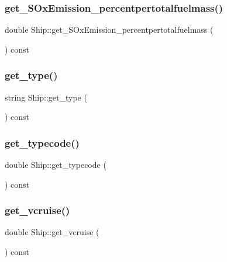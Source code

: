 \mbox{\label{class_ship_a998e0000dd910bc994fd12f4aaf563b0}} 
\subsubsection{\texorpdfstring{get\_SOxEmission\_percentpertotalfuelmass()}{get\_SOxEmission\_percentpertotalfuelmass()}}
{\footnotesize\ttfamily double Ship\+::get\+\_\+\+S\+Ox\+Emission\+\_\+percentpertotalfuelmass (\begin{DoxyParamCaption}{ }\end{DoxyParamCaption}) const}

\mbox{\label{class_ship_aebaeb01a662f1f7e931b98cdea0c53e9}} 
\subsubsection{\texorpdfstring{get\_type()}{get\_type()}}
{\footnotesize\ttfamily string Ship\+::get\+\_\+type (\begin{DoxyParamCaption}{ }\end{DoxyParamCaption}) const}

\mbox{\label{class_ship_aef1503d801ea6d480de882893ca1f492}} 
\subsubsection{\texorpdfstring{get\_typecode()}{get\_typecode()}}
{\footnotesize\ttfamily double Ship\+::get\+\_\+typecode (\begin{DoxyParamCaption}{ }\end{DoxyParamCaption}) const}

\mbox{\label{class_ship_a4eb1d4b2502b0aa5a5d4d18fbcdb4af0}} 
\subsubsection{\texorpdfstring{get\_vcruise()}{get\_vcruise()}}
{\footnotesize\ttfamily double Ship\+::get\+\_\+vcruise (\begin{DoxyParamCaption}{ }\end{DoxyParamCaption}) const}

